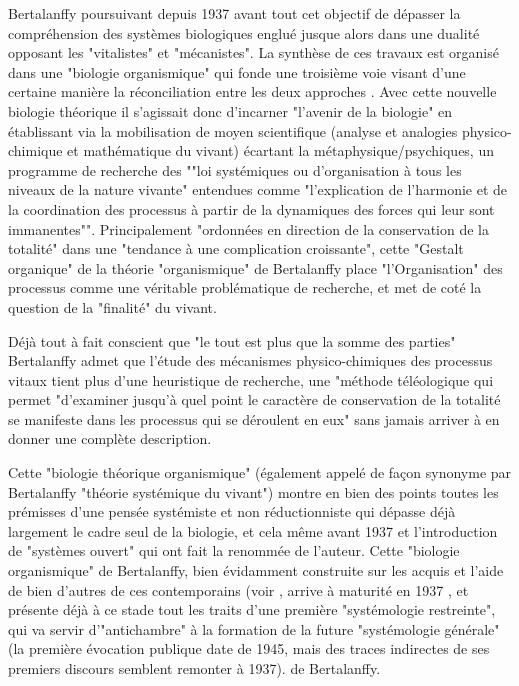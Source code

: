 {Bertalanffy poursuivant depuis 1937 avant tout cet objectif de dépasser la compréhension des systèmes biologiques  englué jusque alors dans une dualité opposant les "vitalistes" et "mécanistes". La synthèse de ces travaux est organisé dans une "biologie organismique" qui fonde une troisième voie visant d'une certaine manière la réconciliation entre les deux approches \autocite[55-56]{Lemoigne1977} \autocite[258]{Bertalanffy1949}. Avec cette nouvelle biologie théorique il s'agissait donc d'incarner "l'avenir de la biologie" en établissant via la mobilisation de moyen scientifique (analyse et analogies physico-chimique et mathématique du vivant) écartant la métaphysique/psychiques, un programme de recherche des ""loi systémiques ou d'organisation à tous les niveaux de la nature vivante" entendues comme "l'explication de l'harmonie et de la coordination des processus à partir de la dynamiques des forces qui leur sont immanentes""\autocite[456]{Pouvreau2013}. Principalement "ordonnées en direction de la conservation de la totalité"\autocite[440-458]{Pouvreau2013} dans une "tendance à une complication croissante", cette "Gestalt organique" de la théorie "organismique" de Bertalanffy place "l'Organisation" des processus comme une véritable problématique de recherche, et met de coté la question de la "finalité" du vivant.\autocite[455-457]{Pouvreau2013}

Déjà tout à fait conscient que "le tout est plus que la somme des parties" Bertalanffy admet que l'étude des mécanismes physico-chimiques des processus vitaux tient plus d'une heuristique de recherche, une "méthode téléologique qui permet "d'examiner jusqu’à quel point le caractère de conservation de la totalité se manifeste dans les processus qui se déroulent en eux" sans jamais arriver à en donner une complète description.\autocite[464]{Pouvreau2013}

Cette "biologie théorique organismique" (également appelé de façon synonyme par Bertalanffy "théorie systémique du vivant") montre en bien des points toutes les prémisses d'une pensée systémiste et non réductionniste qui dépasse déjà largement le cadre seul de la biologie, et cela même avant 1937 et l'introduction de "systèmes ouvert" \autocite[499]{Pouvreau2013} qui ont fait la renommée de l'auteur.  Cette "biologie organismique" de Bertalanffy, bien évidamment construite sur les acquis et l'aide de bien d'autres de ces contemporains (voir \autocite{Pouvreau2013}, arrive à maturité en 1937 \autocite[14]{Pouvreau2013}, et présente déjà à ce stade tout les traits d'une première "systémologie restreinte", qui va servir d'"antichambre" à la formation de la future "systémologie générale" (la première évocation publique date de 1945, mais des traces indirectes de ses premiers discours semblent remonter à 1937).\autocite[670]{Pouvreau2013} de Bertalanffy.

}
